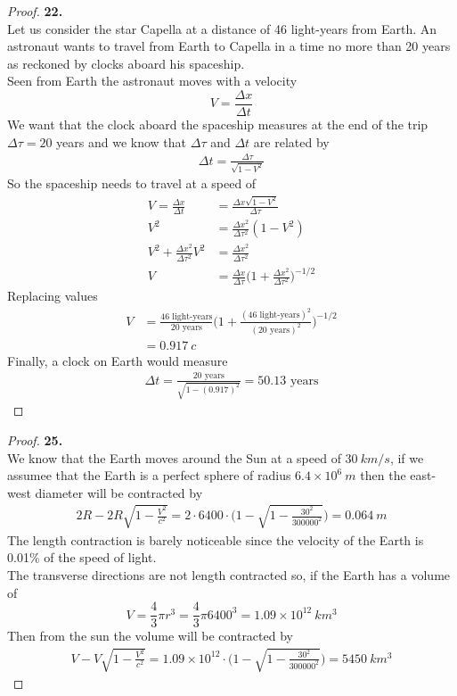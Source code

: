 \documentclass[11pt]{article}
\newcommand{\sci}[1]{\times 10^{#1}}
\theoremstyle{definition}
\begin{document}
\cleardoublepage
\begin{proof}{\textbf{22.}}\\
Let us consider the star Capella at a distance of 46 light-years from Earth.
An astronaut wants to travel from Earth to Capella in a time no more than 
20 years as reckoned by clocks aboard his spaceship.\\
Seen from Earth the astronaut moves with a velocity
$$V = \frac{\Delta x}{\Delta t}$$
We want that the clock aboard the spaceship measures at the end of
the trip $\Delta \tau = 20$ years and we know that $\Delta \tau$ and $\Delta t$
are related by
\begin{align*}
    \Delta t = \frac{\Delta \tau}{\sqrt{1 - V^2}}
\end{align*}
So the spaceship needs to travel at a speed of
\begin{align*}
    V = \frac{\Delta x}{\Delta t}
    &= \frac{\Delta x\sqrt{1 - V^2}}{\Delta \tau}\\
    V^2 &= \frac{\Delta x^2}{\Delta \tau^2}(1 - V^2)\\
    V^2 + \frac{\Delta x^2}{\Delta \tau^2}V^2
    &= \frac{\Delta x^2}{\Delta \tau^2}\\
    V &= \frac{\Delta x}{\Delta \tau}
    \bigg(1 + \frac{\Delta x^2}{\Delta \tau^2}\bigg)^{-1/2}
\end{align*}
Replacing values
\begin{align*}
    V &= \frac{46 \text{ light-years}}{20 \text{ years}}
    \bigg(1 + \frac{(46 \text{ light-years})^2}{(20 \text{ years})^2}\bigg)^{-1/2}\\
    &= 0.917~c
\end{align*}
Finally, a clock on Earth would measure
\begin{align*}
    \Delta t = \frac{20\text{ years}}{\sqrt{1 - (0.917)^2}}
    = 50.13\text{ years}
\end{align*}

\end{proof}

\cleardoublepage
\begin{proof}{\textbf{25.}}\\
We know that the Earth moves around the Sun at a speed of $30~km/s$, if 
we assumee that the Earth is a perfect sphere of radius $6.4\sci{6}~m$ then 
the east-west diameter will be contracted by
\begin{align*}
    2R - 2R \sqrt{1 - \frac{V^2}{c^2}}
    = 2 \cdot 6400\cdot \bigg(1 - \sqrt{1 - \frac{30^2}{300000^2}}\bigg)
    = 0.064~m
\end{align*}
The length contraction is barely noticeable since the velocity of the Earth
is 0.01\% of the speed of light.\\
The transverse directions are not length contracted so, if the Earth has a
volume of
$$V = \frac{4}{3} \pi r^3 = \frac{4}{3} \pi 6400^3
= 1.09\sci{12}~km^3$$
Then from the sun the volume will be contracted by
\begin{align*}
    V - V \sqrt{1 - \frac{V^2}{c^2}}
    = 1.09\sci{12}\cdot\bigg(1 - \sqrt{1 - \frac{30^2}{300000^2}}\bigg)
    = 5450~km^3
\end{align*}
\end{proof}
\end{document}
